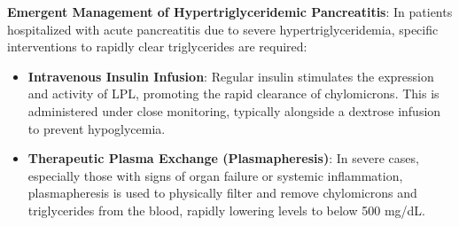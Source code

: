 \textbf{Emergent Management of Hypertriglyceridemic Pancreatitis}:
In patients hospitalized with acute pancreatitis due to severe hypertriglyceridemia, specific interventions to rapidly clear triglycerides are required:
\begin{itemize}
    \item \textbf{Intravenous Insulin Infusion}: Regular insulin stimulates the expression and activity of LPL, promoting the rapid clearance of chylomicrons. This is administered under close monitoring, typically alongside a dextrose infusion to prevent hypoglycemia.
    \item \textbf{Therapeutic Plasma Exchange (Plasmapheresis)}: In severe cases, especially those with signs of organ failure or systemic inflammation, plasmapheresis is used to physically filter and remove chylomicrons and triglycerides from the blood, rapidly lowering levels to below 500 mg/dL.
\end{itemize}

